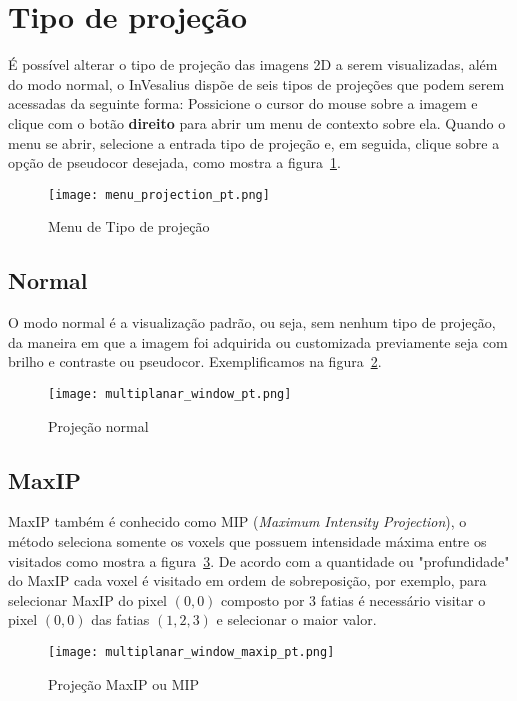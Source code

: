 \newpage

\section{Tipo de projeção}

É possível alterar o tipo de projeção das imagens 2D a serem visualizadas, além do modo normal, o InVesalius dispõe de seis tipos de projeções que podem serem acessadas da seguinte forma: Possicione o cursor do mouse sobre a imagem e clique com o botão \textbf{direito} para abrir um menu de contexto sobre ela. Quando o menu se abrir, selecione a entrada tipo de projeção e, em seguida, clique sobre a opção de pseudocor desejada, como mostra a figura~\ref{fig:menu_proj}.

\begin{figure}[H]
\centering
\texttt{[image: menu\_projection\_pt.png]}
\caption{Menu de Tipo de projeção}
\label{fig:menu_proj}
\end{figure}

\subsection{Normal}

O modo normal é a visualização padrão, ou seja, sem nenhum tipo de projeção, da maneira em que a imagem foi adquirida ou customizada previamente seja com brilho e contraste ou pseudocor. Exemplificamos na figura~\ref{fig:proj_normal}.

\begin{figure}[H]
\centering
\texttt{[image: multiplanar\_window\_pt.png]}
\caption{Projeção normal}
\label{fig:proj_normal}
\end{figure}

\subsection{MaxIP}
\label{sec:max_ip}
MaxIP também é conhecido como MIP (\textit{Maximum Intensity Projection}), o método seleciona somente os voxels que possuem intensidade máxima entre os visitados como mostra a figura~\ref{fig:proj_maxip}. De acordo com a quantidade ou "profundidade" do MaxIP cada voxel é visitado em ordem de sobreposição, por exemplo, para selecionar MaxIP do pixel $(0,0)$ composto por 3 fatias é necessário visitar o pixel $(0,0)$ das fatias $(1,2,3)$ e selecionar o maior valor.

\begin{figure}[H]
\centering
\texttt{[image: multiplanar\_window\_maxip\_pt.png]}
\caption{Projeção MaxIP ou MIP}
\label{fig:proj_maxip}
\end{figure}

